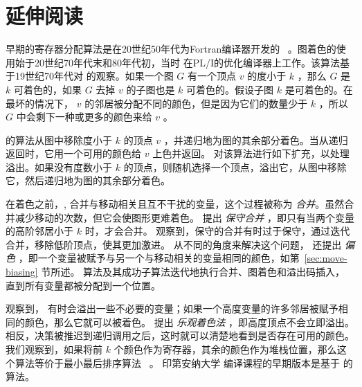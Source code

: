 \documentclass[11pt]{book}
\begin{document}



\section{延伸阅读}
\label{sec:register-allocation-further-reading}

早期的寄存器分配算法是在20世纪50年代为Fortran编译器开发的~\citep{Horwitz:1966aa,Backus:1978aa} 。图着色的使用始于20世纪70年代末和80年代初，当时 \citet{Chaitin:1981vl} 在PL/I的优化编译器上工作。该算法基于19世纪70年代对
\citet{Kempe:1879aa} 的观察。如果一个图 $G$ 有一个顶点 $v$
的度小于 $k$ ，那么 $G$ 是 $k$ 可着色的，如果 $G$ 去掉 $v$ 的子图也是 $k$ 可着色的。假设子图 $k$ 是可着色的。在最坏的情况下， $v$ 的邻居被分配不同的颜色，但是因为它们的数量少于 $k$ ，所以 $G$ 中会剩下一种或更多的颜色来给 $v$ 。

 \citet{Chaitin:1981vl} 的算法从图中移除度小于 $k$ 的顶点 $v$ ，并递归地为图的其余部分着色。当从递归返回时，它用一个可用的颜色给 $v$ 上色并返回。 \citet{Chaitin:1982vn} 对该算法进行如下扩充，以处理溢出。如果没有度数小于 $k$ 的顶点，则随机选择一个顶点，溢出它，从图中移除它，然后递归地为图的其余部分着色。

在着色之前，, \citet{Chaitin:1981vl} 合并与移动相关且互不干扰的变量，这个过程被称为 \emph{合并}。虽然合并减少移动的次数，但它会使图形更难着色。 \citet{Briggs:1994kx} 提出 \emph{保守合并} ，即只有当两个变量的高阶邻居小于 $k$
时，才会合并。 \citet{George:1996aa} 观察到，保守的合并有时过于保守，通过迭代合并，移除低阶顶点，使其更加激进。
%
从不同的角度来解决这个问题， \citet{Briggs:1994kx}
还提出 \emph{偏色} ，即一个变量被赋予与另一个与移动相关的变量相同的颜色，如第~\ref{sec:move-biasing} 节所述。
%
 \citet{Chaitin:1981vl} 算法及其成功子算法迭代地执行合并、图着色和溢出码插入，直到所有变量都被分配到一个位置。

\citet{Briggs:1994kx} 观察到， \citet{Chaitin:1982vn} 有时会溢出一些不必要的变量；如果一个高度变量的许多邻居被赋予相同的颜色，那么它就可以被着色。
\citet{Briggs:1994kx} 提出 \emph{乐观着色法} ，即高度顶点不会立即溢出。相反，决策被推迟到递归调用之后，这时就可以清楚地看到是否存在可用的颜色。我们观察到，如果将前  $k$ 
个颜色作为寄存器，其余的颜色作为堆栈位置，那么这个算法等价于最小最后排序算法~\citep{Matula:1972aa} 。
印第安纳大学
\citep{Dybvig:2010aa} 编译课程的早期版本是基于
\citet{Briggs:1994kx} 的算法。
\end{document}
